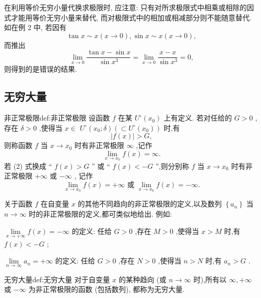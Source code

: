 \begin{remark}
在利用等价无穷小量代换求极限时, 应注意: 只有对所求极限式中相乘或相除的因式才能用等价无穷小量来替代, 而对极限式中的相加或相减部分则不能随意替代. 如在例 2 中, 若因有
\[
\tan x \sim  x\left( {x \rightarrow  0}\right) ,\sin x \sim  x\left( {x \rightarrow  0}\right) ,
\]
而推出
\[
\mathop{\lim }\limits_{{x \rightarrow  0}}\frac{\tan x - \sin x}{\sin {x}^{3}} = \mathop{\lim }\limits_{{x \rightarrow  0}}\frac{x - x}{\sin {x}^{3}} = 0,
\]
则得到的是错误的结果.
\end{remark}


\subsection{无穷大量}

\begin{definition}{非正常极限}{def:非正常极限}
设函数 \(f\) 在某 \({U}^{ \circ  }\left( {x}_{0}\right)\) 上有定义. 若对任给的 \(G > 0\) ,存在 \(\delta  > 0\) ,使得当 \(x \in\)  \({U}^{ \circ  }\left( {{x}_{0};\delta }\right) \left( { \subset  {U}^{ \circ  }\left( {x}_{0}\right) }\right)\) 时,有
\[
\left| {f\left( x\right) }\right|  > G, \tag{2}
\]
则称函数 \(f\) 当 \(x \rightarrow  {x}_{0}\) 时有非正常极限 \(\infty\) ,记作
\[
\mathop{\lim }\limits_{{x \rightarrow  {x}_{0}}}f\left( x\right)  = \infty .
\]
若 (2) 式换成 “ \(f\left( x\right)  > G\) ” 或 “ \(f\left( x\right)  <  - G\) ”,则分别称 \(f\) 当 \(x \rightarrow  {x}_{0}\) 时有非正常极限 \(+ \infty\) 或 \(- \infty\) , 记作
\[
\mathop{\lim }\limits_{{x \rightarrow  {x}_{0}}}f\left( x\right)  =  + \infty \text{ 或 }\mathop{\lim }\limits_{{x \rightarrow  {x}_{0}}}f\left( x\right)  =  - \infty .
\]
\end{definition}

关于函数 \(f\) 在自变量 \(x\) 的其他不同趋向的非正常极限的定义,以及数列 \(\left\{  {a}_{n}\right\}\) 当 \(n \rightarrow  \infty\) 时的非正常极限的定义,都可类似地给出. 例如:

\(\mathop{\lim }\limits_{{x \rightarrow   + \infty }}f\left( x\right)  =  - \infty\) 的定义: 任给 \(G > 0\) ,存在 \(M > 0\) ,使得当 \(x > M\) 时,有 \(f\left( x\right)  <  - G\) ;

\(\mathop{\lim }\limits_{{n \rightarrow  \infty }}{a}_{n} =  + \infty\) 的定义: 任给 \(G > 0\) ,存在 \(N > 0\) ,使得当 \(n > N\) 时,有 \({a}_{n} > G\) .

\begin{definition}{无穷大量}{def:无穷大量}
对于自变量 \(x\) 的某种趋向 (或 \(n \rightarrow  \infty\) 时),所有以 \(\infty , + \infty\) 或 \(- \infty\) 为非正常极限的函数 (包括数列), 都称为无穷大量.
\end{definition}


